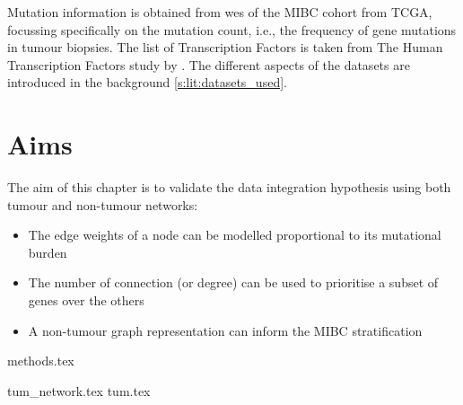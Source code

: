 Mutation information is obtained from \acrfull{wes} of the MIBC cohort from TCGA, focussing specifically on the mutation count, i.e., the frequency of gene mutations in tumour biopsies. The list of Transcription Factors is taken from The Human Transcription Factors study by \citet{Lambert2018-el}. The different aspects of the datasets are introduced in the background \cref{s:lit:datasets_used}.




\section{Aims}

The aim of this chapter is to validate the data integration hypothesis using both tumour and non-tumour networks:

\begin{itemize}
    \item The edge weights of a node can be modelled proportional to its mutational burden
    \item The number of connection (or degree) can be used to prioritise a subset of genes over the others
    \item A non-tumour graph representation can inform the MIBC stratification 
\end{itemize}


{methods.tex}



{tum_network.tex}
{tum.tex}


